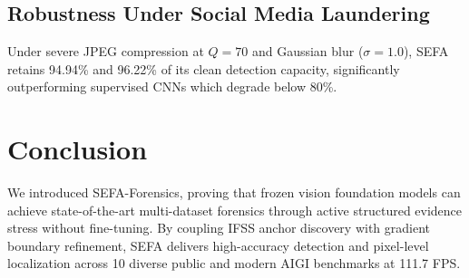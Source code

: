 \documentclass[10pt,journal,compsoc]{IEEEtran}
\begin{document}
\begin{table}[t]
\centering
\caption{Ablation Study on Evidence Stress Modes and Channel Selection.}
\label{tab:ablation}
\end{table}

\subsection{Robustness Under Social Media Laundering}
Under severe JPEG compression at $Q=70$ and Gaussian blur ($\sigma=1.0$), SEFA retains 94.94\% and 96.22\% of its clean detection capacity, significantly outperforming supervised CNNs which degrade below 80\%.

\section{Conclusion}
We introduced SEFA-Forensics, proving that frozen vision foundation models can achieve state-of-the-art multi-dataset forensics through active structured evidence stress without fine-tuning. By coupling IFSS anchor discovery with gradient boundary refinement, SEFA delivers high-accuracy detection and pixel-level localization across 10 diverse public and modern AIGI benchmarks at 111.7 FPS.



\end{document}
